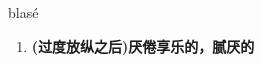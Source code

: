 
\begin{frame}
{\huge blasé}
\begin{center}
\begin{enumerate}\Large
  \item \textbf{(过度放纵之后)厌倦享乐的，腻厌的}
\end{enumerate}
\end{center}
\end{frame}

